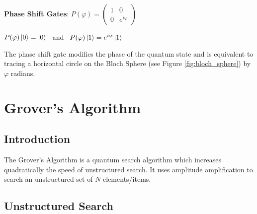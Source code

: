 \documentclass{article}
\begin{document}
\textbf{Phase Shift Gates}: \qquad $ P(\varphi) = \begin{pmatrix} 1 & 0 \\ 0 & e^{i\varphi} \end{pmatrix}$ 
\vspace{5mm}

\qquad $P(\varphi)\ket{0} = \ket{0}$ \ and \ $P(\varphi)\ket{1} = e^{i\varphi}\ket{1}$
\vspace{5mm}

\noindent
The phase shift gate modifies the phase of the quantum state and is equivalent to tracing a horizontal circle on the Bloch Sphere (see Figure \ref{fig:bloch_sphere}) by $\varphi$ radians\cite{noauthor_quantum_nodate}. 
\pagebreak






\section{Grover's Algorithm}
\subsection{Introduction}

The Grover's Algorithm is a quantum search algorithm which increases quadratically the speed of unstructured search\cite{noauthor_grovers_nodate}. It uses  amplitude amplification to search an unstructured set of $N$ elements/items. 

\subsection{Unstructured Search}
\vspace{10mm}
\end{document}

